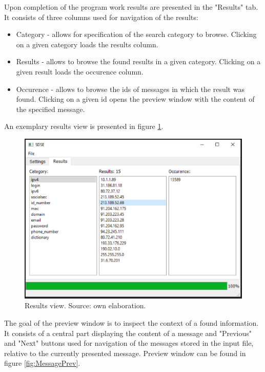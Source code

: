 \documentclass[a4paper,twoside,12pt]{book}
\begin{document}
Upon completion of the program work results are presented in the "Results" tab. It consists of three columns used for
navigation of the results: 
\begin{itemize}
   \item Category - allows for specification of the search category to browse. Clicking on a given category loads
   the results column.
   \item Results - allows to browse the found results in a given category. Clicking on a given result loads the 
   occurence column.
   \item Occurence - allows to browse the ids of messages in which the result was found. Clicking on a given id
   opens the preview window with the content of the specified message.
\end{itemize}

An exemplary results view is presented in figure \ref{fig:ResultsTab}.

\begin{figure}
\centering
\includegraphics{Images/ResultsTab}
\caption{Results view. Source: own elaboration.}
\label{fig:ResultsTab}
\end{figure}

The goal of the preview window is to inspect the context of a found information. It consists of a central part 
displaying the content of a message and "Previous" and "Next" buttons used for navigation of the messages stored
in the input file, relative to the currently presented message. Preview window can be found in figure \ref{fig:MessagePrev}.
\end{document}
